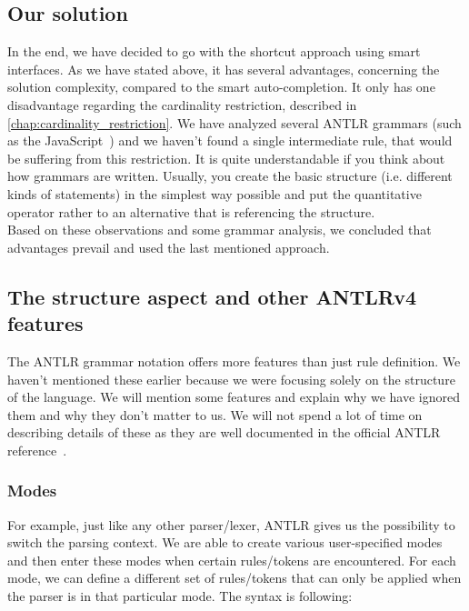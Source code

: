 

\pagebreak

\subsection{Our solution}
\label{chap:structure_solution}

In the end, we have decided to go with the shortcut approach using smart interfaces.
As we have stated above, it has several advantages, concerning the solution complexity, compared to the smart auto-completion.
It only has one disadvantage regarding the cardinality restriction, described in \ref{chap:cardinality_restriction}.
We have analyzed several ANTLR grammars (such as the JavaScript~\cite{javascript}) and we haven't found a single intermediate rule, that would be suffering from this restriction.
It is quite understandable if you think about how grammars are written.
Usually, you create the basic structure (i.e. different kinds of statements) in the simplest way possible and put the quantitative operator rather to an alternative that is referencing the structure.
\\

Based on these observations and some grammar analysis, we concluded that advantages prevail and used the last mentioned approach.

\subsection{The structure aspect and other ANTLRv4 features}

The ANTLR grammar notation offers more features than just rule definition.
We haven't mentioned these earlier because we were focusing solely on the structure of the language.
We will mention some features and explain why we have ignored them and why they don't matter to us.
We will not spend a lot of time on describing details of these as they are well documented in the official ANTLR reference~\cite{ANTLR4reference}.

\subsubsection{Modes}

For example, just like any other parser/lexer, ANTLR gives us the possibility to switch the parsing context.
We are able to create various user-specified modes and then enter these modes when certain rules/tokens are encountered.
For each mode, we can define a different set of rules/tokens that can only be applied when the parser is in that particular mode.
The syntax is following:

